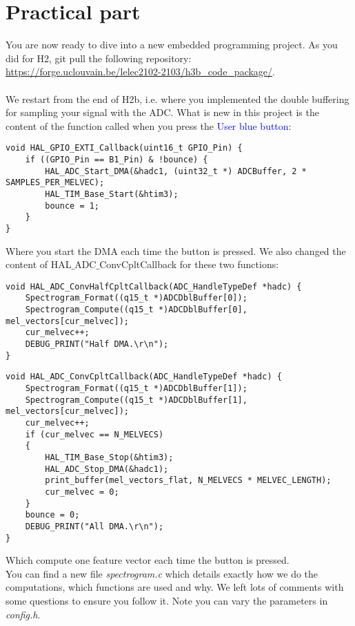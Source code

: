 \section{Practical part}
%
You are now ready to dive into a new embedded programming project. As you did for H2, git pull the following repository: \\
\url{https://forge.uclouvain.be/lelec2102-2103/h3b_code_package/}. \\
\\
We restart from the end of H2b, i.e. where you implemented the double buffering for sampling your signal with the ADC. What is new in this project is the content of the function called when you press the \textcolor{blue}{User blue button}: \\
%
\begin{lstlisting}
void HAL_GPIO_EXTI_Callback(uint16_t GPIO_Pin) {
	if ((GPIO_Pin == B1_Pin) & !bounce) {
		HAL_ADC_Start_DMA(&hadc1, (uint32_t *) ADCBuffer, 2 * SAMPLES_PER_MELVEC);
		HAL_TIM_Base_Start(&htim3);
		bounce = 1;
	}
}
\end{lstlisting}
%
Where you start the DMA each time the button is pressed. We also changed the content of \newline HAL$\_$ADC$\_$ConvCpltCallback for these two functions:
%
\begin{lstlisting}
void HAL_ADC_ConvHalfCpltCallback(ADC_HandleTypeDef *hadc) {
	Spectrogram_Format((q15_t *)ADCDblBuffer[0]);
	Spectrogram_Compute((q15_t *)ADCDblBuffer[0], mel_vectors[cur_melvec]);
	cur_melvec++;
	DEBUG_PRINT("Half DMA.\r\n");
}
\end{lstlisting}
\begin{lstlisting}
void HAL_ADC_ConvCpltCallback(ADC_HandleTypeDef *hadc) {
	Spectrogram_Format((q15_t *)ADCDblBuffer[1]);
	Spectrogram_Compute((q15_t *)ADCDblBuffer[1], mel_vectors[cur_melvec]);
	cur_melvec++;
	if (cur_melvec == N_MELVECS)
	{
		HAL_TIM_Base_Stop(&htim3);
		HAL_ADC_Stop_DMA(&hadc1);
		print_buffer(mel_vectors_flat, N_MELVECS * MELVEC_LENGTH);
		cur_melvec = 0;
	}
	bounce = 0;
	DEBUG_PRINT("All DMA.\r\n");
}
\end{lstlisting}
%
Which compute one feature vector each time the button is pressed. \\
You can find a new file \emph{spectrogram.c} which details exactly how we do the computations, which functions are used and why. We left lots of comments with some questions to ensure you follow it. Note you can vary the parameters in \emph{config.h}.  \\
\\

